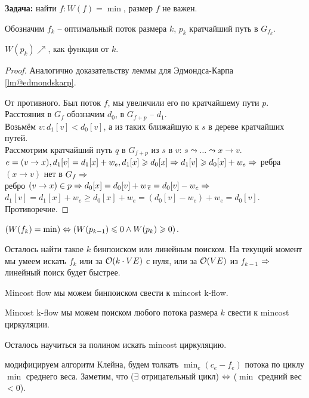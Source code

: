 
{\bf Задача:} найти $f \colon W(f) = \min$, размер $f$ не важен.

Обозначим $f_k$ -- оптимальный поток размера $k$, $p_k$ кратчайший путь в $G_{f_k}$.

\begin{Lm}$W(p_k){\nearrow}$, как функция от $k$.\end{Lm}

\up\up
\begin{proof}
Аналогично доказательству леммы для Эдмондса-Карпа \autoref{lm@edmondskarp}.

От противного. Был поток $f$, мы увеличили его по кратчайшему пути $p$.\\
Расстояния в $G_f$ обозначим $d_0$, в $G_{f+p}$ -- $d_1$. \\
Возьмём $v \colon d_1[v] < d_0[v]$, а из таких ближайшую к $s$ в дереве кратчайших путей. \\
Рассмотрим кратчайший путь $q$ в $G_{f+p}$ из $s$ в $v$: $s \leadsto \dots \leadsto x \to v$.\\
$e = (v \to x), d_1[v] = d_1[x] + w_e, d_1[x] \geqslant d_0[x] \Rightarrow d_1[v] \geqslant d_0[x] + w_e \Rightarrow$ ребра $(x \to v)$ нет в $G_f \Rightarrow$\\
ребро $(v \to x) \in p \Rightarrow d_0[x] = d_0[v] + w_{\,\overline{e}} = d_0[v] - w_e \Rightarrow$\\
$d_1[v] = d_1[x] + w_e \ge d_0[x] + w_e = (d_0[v] - w_e) + w_e = d_0[v]$. Противоречие.
\end{proof}

\begin{Cons}
$(W(f_k) = \min) \Leftrightarrow (W(p_{k-1}) \leqslant 0 \wedge W(p_k) \geqslant 0)$.
\end{Cons}
Осталось найти такое $k$ бинпоиском или линейным поиском.
На текущий момент мы умеем искать $f_k$ или за $\mathcal{O}(k \cdot VE)$ с нуля, или за $\mathcal{O}(VE)$ из $f_{k-1}$ 
$\Rightarrow$ линейный поиск будет быстрее.


Mincost flow мы можем бинпоиском свести к mincost k-flow.

Mincost k-flow мы можем поиском любого потока размера $k$ свести к mincost циркуляции.

Осталось научиться за полином искать mincost циркуляцию.

 модифицируем алгоритм Клейна, будем толкать $\min_e(c_e{-}f_e)$ потока по циклу $\min$ среднего веса.
Заметим, что ($\exists$ отрицательный цикл) $\Leftrightarrow$ ($\min$ средний вес $< 0$).

